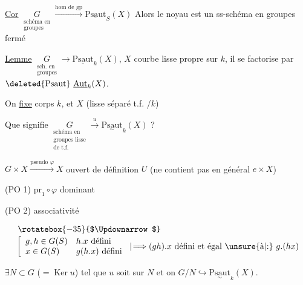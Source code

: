\uline{Cor} \(\underset{\substack{\text{schéma en}\\\text{groupes}}}{G}\xrightarrow{\text{hom de gp}}\underline{\mathrm{Psaut}}_S(X)\) Alors le noyau est un ss-schéma en groupes fermé



\uline{Lemme} \(\underset{\substack{\text{sch. en}\\\text{groupes}}}{G}\longrightarrow\underline{\mathrm{Psaut}}_k(X)\), $X$ courbe lisse propre sur $k$, il se factorise par $\deleted{\mathrm{Psaut}}\ \underline{\mathrm{Aut}}_k(X)$.

On \uline{fixe} corps $k$, et $X$ (lisse séparé t.f. /$k$)

Que signifie \(\underset{\substack{\text{schéma en}\\\text{groupes lisse}\\\text{de t.f.}}}{G}\xrightarrow{u}\underset{\sim}{\mathrm{Psaut}}_k(X)\) ?

\(G\times X\xrightarrow{\text{pseudo }\varphi} X\) ouvert de définition $U$ (ne contient pas en général $e\times X$)

(PO 1) \(\mathrm{pr}_1\circ\varphi\) dominant

(PO 2) associativité


\[
\begin{aligned}
&\mathrel{\rotatebox{-35}{$\Updownarrow$}}\\[-2pt]
&\left[\begin{array}{ll}
g,h\in G(S) & h.x\ \text{défini}\\
x\in G(S) & g(h.x)\ \text{défini}
\end{array}\right.
\mathrel{\vert\!\Longrightarrow}(gh).x\ \text{défini et égal \unsure{à|:} }g.(hx)
\end{aligned}
\]

$\exists N\subset G$ ($=\operatorname{Ker}u$) tel que $u$ soit  sur $N$ et on  $G/N\hookrightarrow\underset{\sim}{\mathrm{Psaut}}_k(X)$.

